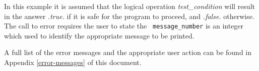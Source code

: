 In this example it is assumed that the logical operation {\em
test\_condition} will result in the answer {\em .true.} if it is
safe for the program to proceed, and {\em .false.} otherwise.  The
call to {\sc error} requires the user to state the {\tt
message\_number} is an integer which used to identify the
appropriate message to be printed.

A full list of the \D error messages  and the
appropriate user action can be found in Appendix
\ref{error-messages} of this document.
